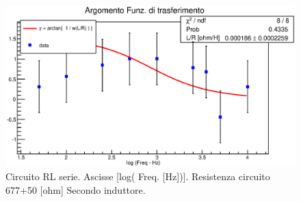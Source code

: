 \begin{figure}[H]
\centering
\includegraphics[scale=0.7]{Grafici/C3_P1_ArgFdT_ind2.eps}
\caption{
Circuito RL serie.
Ascisse [log( Freq. [Hz])].
Resistenza circuito 677+50 [ohm]
Secondo induttore.
}
\label{fig:C3_P1_ArgFdT_ind2}
\end{figure}

